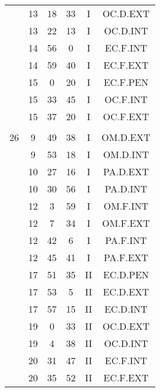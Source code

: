 \documentclass[12pt, a4paper]{article}
\begin{document}
\begin{multicols}{3}
{\begin{tabular}{c c c c c c}
	 	 	 	 & 13 & 18 & 33 & I & OC.D.EXT\\%
	 	 	 	 & 13 & 22 & 13 & I & OC.D.INT\\%
	 	 	 	 & 14 & 56 & 0 & I & EC.F.INT\\%
	 	 	 	 & 14 & 59 & 40 & I & EC.F.EXT\\%
	 	 	 	 & 15 & 0 & 20 & I & EC.F.PEN\\%
	 	 	 	 & 15 & 33 & 45 & I & OC.F.INT\\%
	 	 	 	 & 15 & 37 & 20 & I & OC.F.EXT\\%
	 	 	 	 & & & & & \\%
	 	 	 	26 & 9 & 49 & 38 & I & OM.D.EXT\\%
	 	 	 	 & 9 & 53 & 18 & I & OM.D.INT\\%
	 	 	 	 & 10 & 27 & 16 & I & PA.D.EXT\\%
	 	 	 	 & 10 & 30 & 56 & I & PA.D.INT\\%
	 	 	 	 & 12 & 3 & 59 & I & OM.F.INT\\%
	 	 	 	 & 12 & 7 & 34 & I & OM.F.EXT\\%
	 	 	 	 & 12 & 42 & 6 & I & PA.F.INT\\%
	 	 	 	 & 12 & 45 & 41 & I & PA.F.EXT\\%
	 	 	 	 & 17 & 51 & 35 & II & EC.D.PEN\\%
	 	 	 	 & 17 & 53 & 5 & II & EC.D.EXT\\%
	 	 	 	 & 17 & 57 & 15 & II & EC.D.INT\\%
	 	 	 	 & 19 & 0 & 33 & II & OC.D.EXT\\%
	 	 	 	 & 19 & 4 & 38 & II & OC.D.INT\\%
	 	 	 	 & 20 & 31 & 47 & II & EC.F.INT\\%
	 	 	 	 & 20 & 35 & 52 & II & EC.F.EXT\\%

\end{tabular}}
\end{multicols}
\end{document}
